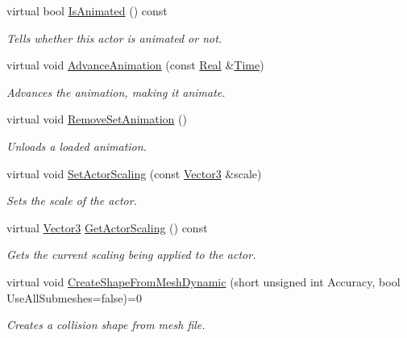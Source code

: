 \begin{DoxyCompactItemize}
virtual bool \hyperlink{classphys_1_1ActorBase_a111d95076bf455fd3d4c68d27c8b0db4}{IsAnimated} () const 
\begin{DoxyCompactList}\small\item\em Tells whether this actor is animated or not. \item\end{DoxyCompactList}\item 
virtual void \hyperlink{classphys_1_1ActorBase_aeab3b1111780577a9dc59893ff880fbf}{AdvanceAnimation} (const \hyperlink{namespacephys_af7eb897198d265b8e868f45240230d5f}{Real} \&\hyperlink{structphys_1_1Time}{Time})
\begin{DoxyCompactList}\small\item\em Advances the animation, making it animate. \item\end{DoxyCompactList}\item 
virtual void \hyperlink{classphys_1_1ActorBase_ac42e5e47504d7f296bb0a2bedc2ded07}{RemoveSetAnimation} ()
\begin{DoxyCompactList}\small\item\em Unloads a loaded animation. \item\end{DoxyCompactList}\item 
virtual void \hyperlink{classphys_1_1ActorBase_ac788ec31a3f70183b72b0246136bd557}{SetActorScaling} (const \hyperlink{classphys_1_1Vector3}{Vector3} \&scale)
\begin{DoxyCompactList}\small\item\em Sets the scale of the actor. \item\end{DoxyCompactList}\item 
virtual \hyperlink{classphys_1_1Vector3}{Vector3} \hyperlink{classphys_1_1ActorBase_a025491d083a18471628a9b57339dd17c}{GetActorScaling} () const 
\begin{DoxyCompactList}\small\item\em Gets the current scaling being applied to the actor. \item\end{DoxyCompactList}\item 
virtual void \hyperlink{classphys_1_1ActorBase_a85a06be4c1f069c45215dc9574e2fb23}{CreateShapeFromMeshDynamic} (short unsigned int Accuracy, bool UseAllSubmeshes=false)=0
\begin{DoxyCompactList}\small\item\em Creates a collision shape from mesh file. \item\end{DoxyCompactList}\item 

\end{DoxyCompactItemize}
